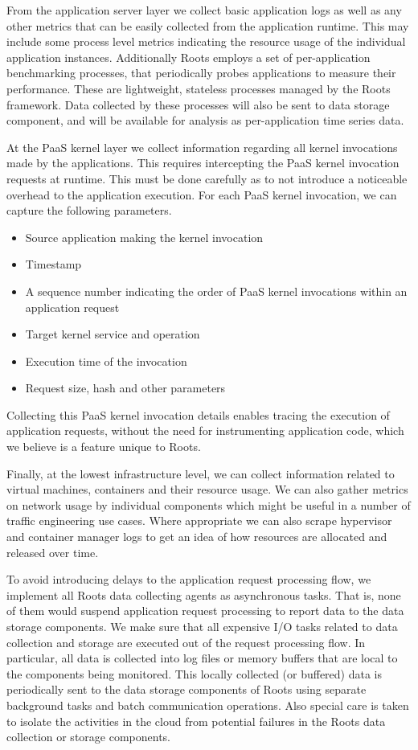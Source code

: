 From the application server layer we collect basic application logs as well as any other
metrics that can be easily collected from the application runtime. This may include some process level
metrics indicating the resource usage of the individual application instances. Additionally Roots
employs a set of per-application benchmarking processes, that periodically probes applications
to measure their performance. These are lightweight, stateless processes managed by the Roots framework.
Data collected by these processes will also be sent to data storage component, and will be available
for analysis as per-application time series data.

At the PaaS kernel layer we collect information regarding all kernel invocations
made by the applications. This requires intercepting the PaaS kernel invocation
requests at runtime. This must be done carefully as to not introduce a noticeable
overhead to the application execution. For each PaaS kernel invocation, we can capture the 
following parameters.
\begin{itemize}
\item Source application making the kernel invocation
\item Timestamp
\item A sequence number indicating the order of PaaS kernel invocations within an application request
\item Target kernel service and operation
\item Execution time of the invocation
\item Request size, hash and other parameters
\end{itemize}
Collecting this PaaS kernel invocation details enables tracing the execution of application 
requests, without the need for instrumenting application code, which we believe is a feature 
unique to Roots. 

Finally, at the lowest infrastructure level, we can collect information related to virtual machines, containers
and their resource usage. We can also gather metrics on network usage by individual components which
might be useful in a number of traffic engineering use cases. Where appropriate we can also scrape
hypervisor and container manager logs to get an idea of how resources are allocated and released over
time.

To avoid introducing delays to the application request processing flow, we implement
all Roots data collecting agents as asynchronous tasks. That is, none of them would
suspend application request processing to report data to the data storage components.
We make sure that all expensive I/O tasks related to data collection and storage are
executed out of the request processing flow.
In particular, all data is collected into log files or memory buffers that are local to the components being
monitored. This locally collected (or buffered) data is periodically sent
to the data storage components of Roots using separate background tasks and batch communication
operations. Also special care is taken to isolate the activities in the cloud from potential
failures in the Roots data collection or storage components.

